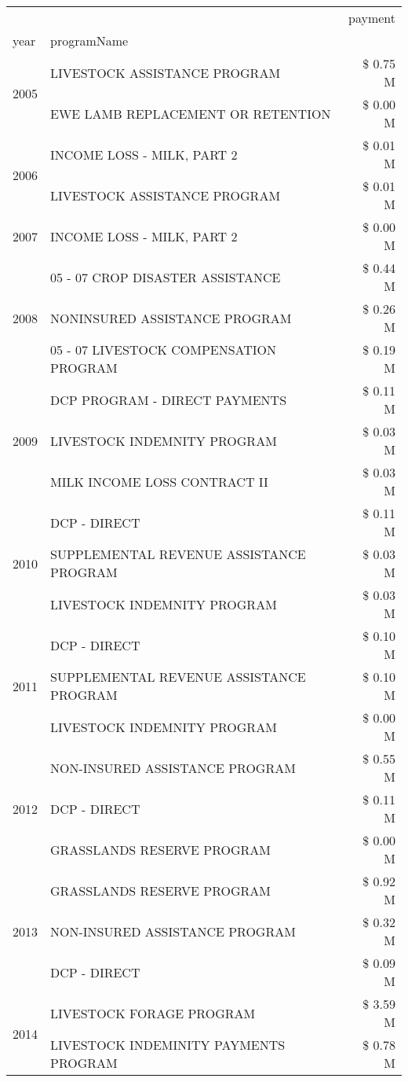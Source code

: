 \begin{tabular}{llr}
\toprule
 &  & payment \\
year & programName &  \\
\midrule
\multirow[t]{2}{*}{2005} & LIVESTOCK ASSISTANCE PROGRAM & \$ 0.75 M \\
 & EWE LAMB REPLACEMENT OR RETENTION & \$ 0.00 M \\
\cline{1-3}
\multirow[t]{2}{*}{2006} & INCOME LOSS - MILK, PART 2 & \$ 0.01 M \\
 & LIVESTOCK ASSISTANCE PROGRAM & \$ 0.01 M \\
\cline{1-3}
2007 & INCOME LOSS - MILK, PART 2 & \$ 0.00 M \\
\cline{1-3}
\multirow[t]{3}{*}{2008} & 05 - 07 CROP DISASTER ASSISTANCE & \$ 0.44 M \\
 & NONINSURED ASSISTANCE PROGRAM & \$ 0.26 M \\
 & 05 - 07 LIVESTOCK COMPENSATION PROGRAM & \$ 0.19 M \\
\cline{1-3}
\multirow[t]{3}{*}{2009} & DCP PROGRAM - DIRECT PAYMENTS & \$ 0.11 M \\
 & LIVESTOCK INDEMNITY PROGRAM & \$ 0.03 M \\
 & MILK INCOME LOSS CONTRACT II & \$ 0.03 M \\
\cline{1-3}
\multirow[t]{3}{*}{2010} & DCP - DIRECT & \$ 0.11 M \\
 & SUPPLEMENTAL REVENUE ASSISTANCE PROGRAM & \$ 0.03 M \\
 & LIVESTOCK INDEMNITY PROGRAM & \$ 0.03 M \\
\cline{1-3}
\multirow[t]{3}{*}{2011} & DCP - DIRECT & \$ 0.10 M \\
 & SUPPLEMENTAL REVENUE ASSISTANCE PROGRAM & \$ 0.10 M \\
 & LIVESTOCK INDEMNITY PROGRAM & \$ 0.00 M \\
\cline{1-3}
\multirow[t]{3}{*}{2012} & NON-INSURED ASSISTANCE PROGRAM & \$ 0.55 M \\
 & DCP - DIRECT & \$ 0.11 M \\
 & GRASSLANDS RESERVE PROGRAM & \$ 0.00 M \\
\cline{1-3}
\multirow[t]{3}{*}{2013} & GRASSLANDS RESERVE PROGRAM & \$ 0.92 M \\
 & NON-INSURED ASSISTANCE PROGRAM & \$ 0.32 M \\
 & DCP - DIRECT & \$ 0.09 M \\
\cline{1-3}
\multirow[t]{3}{*}{2014} & LIVESTOCK FORAGE PROGRAM & \$ 3.59 M \\
 & LIVESTOCK INDEMINITY PAYMENTS PROGRAM & \$ 0.78 M \\

\end{tabular}
